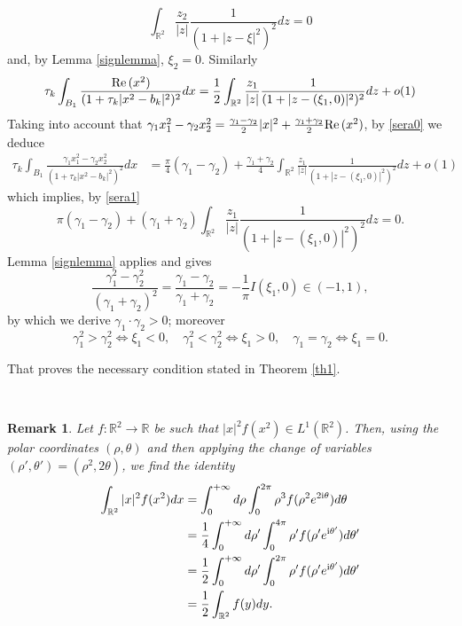 \documentclass[reqno,11pt]{amsart}
\newtheorem{rmk}[thm]{Remark}
\theoremstyle{definition}
\numberwithin{equation}{section}
\newcommand{\intr}{\int_{\R^2}}
\newcommand{\R}{\mathbb{R}}
\newcommand{\into}{\int_{B_1}}
\renewcommand{\(}{\left(}
\renewcommand{\)}{\right)}
\renewcommand{\[}{\left[}
\renewcommand{\]}{\right]}
\def\Re{{\rm Re}\,}
\begin{document}
{$$\int_{\R^2}\frac{z_2}{|z|} \frac{1}{(1+ | z-\xi|^2)^2}  dz=0$$
and, by Lemma \ref{signlemma}, $\xi_2=0$. Similarly
$$\begin{aligned}\tau_k\into   \frac{\Re(x^2)}{(1+ \tau_k|x^{2}-b_k|^2)^2}  dx
=\frac12\int_{\R^2}\frac{z_1}{|z|} \frac{1}{(1+ | z-(\xi_1,0)|^2)^2}  dz+o(1)\end{aligned} $$
Taking into account that   $\gamma_1 x_1^2-\gamma_2 x_2^2=\frac{\gamma_1-\gamma_2 }{2}|x|^2+\frac{\gamma_1+\gamma_2 }{2}\Re(x^2)$, by \eqref{sera0} we deduce
$$\begin{aligned}\tau_k\into   \frac{\gamma_1 x_1^2-\gamma_2 x_2^2}{(1+ \tau_k|x^{2}-b_k|^2)^2}  dx&=\frac\pi4(\gamma_1-\gamma_2 )+\frac{\gamma_1+\gamma_2 }{4}\int_{\R^2}\frac{z_1}{|z|} \frac{1}{(1+ | z-(\xi_1,0)|^2)^2}  dz+o(1)
\end{aligned}$$
which implies, by \eqref{sera1}
$$\pi(\gamma_1-\gamma_2 )+(\gamma_1+\gamma_2 )\int_{\R^2}\frac{z_1}{|z|} \frac{1}{(1+ | z-(\xi_1,0)|^2)^2}  dz=0.$$ Lemma \ref{signlemma} applies and gives $$\frac{\gamma_1^2-\gamma_2^2}{(\gamma_1+\gamma_2)^2}=\frac{\gamma_1-\gamma_2}{\gamma_1+\gamma_2}=-\frac{1}{\pi} I(\xi_1,0)\in (-1,1),$$ by which we derive $\gamma_1\cdot\gamma_2>0$;
moreover $$\gamma_1^2>\gamma_2^2 \Longleftrightarrow \xi_1<0,\quad \gamma_1^2<\gamma_2^2\Longleftrightarrow \xi_1>0,\quad \gamma_1 =\gamma_2 \Longleftrightarrow \xi_1=0.$$
\medskip



That proves the necessary condition stated in Theorem \ref{th1}.

\

 \begin{rmk}\label{remcopycopy} Let  $f:\R^2\to\R$ be such that $|x|^2f(x^2)\in L^1(\R^2)$. 
Then, using  the polar coordinates $(\rho,\theta)$ and then applying the change of variables $(\rho',\theta')=(\rho^{2},2\theta)$, we find the identity
$$\begin{aligned} \intr |x|^{2} f(x^{2}) dx&=\int_0^{+\infty} d\rho\int_0^{2\pi} \rho^{3}f(\rho^{2} e^{2{\rm i} \theta}) d\theta
\\ &= \frac14\int_0^{+\infty} d\rho'\int_0^{4 \pi}  \rho'f(\rho' e^{{\rm i}\theta'}) d\theta' \\ &=\frac{1}{2}\int_0^{+\infty} d\rho'\int_0^{2\pi}  \rho'f(\rho' e^{{\rm i}\theta'}) d\theta'
\\& =\frac{1}{2}\intr f(y) dy.\end{aligned}$$

\end{rmk}


}
\end{document}
